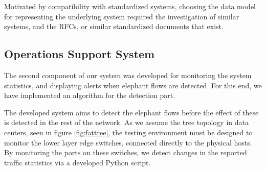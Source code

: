\par Motivated by compatibility with standardized systems, choosing the data model for representing the underlying system required the investigation of similar 
systems, and the RFCs, or similar standardized documents that exist. 

\subsection {Operations Support System}

The second component of our system was developed for monitoring the system statistics, and displaying alerts when elephant flows are detected. For this end, we have
implemented an algorithm for the detection part. 

\par The developed system aims to detect the elephant flows before the effect of these is detected in the rest of the network. As we assume the tree topology in data
centers, seen in figure \ref{fig:fattree}, the testing environment must be designed to monitor the lower layer edge switches, connected directly to the physical 
hosts. By monitoring the ports on these switches, we detect changes in the reported traffic statistics via a developed Python script.
